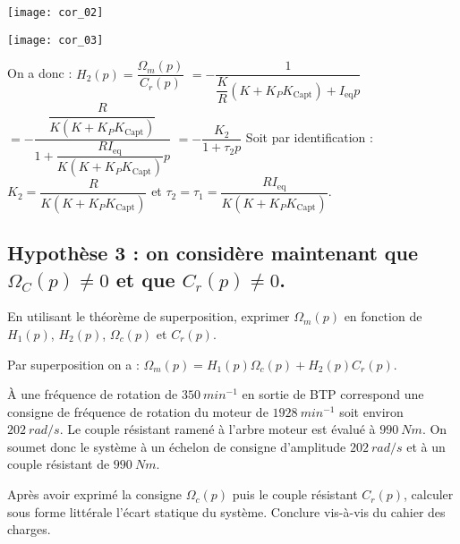 \ifprof
\begin{corrige}
\begin{center}
\texttt{[image: cor\_02]}
\end{center}
\begin{center}
\texttt{[image: cor\_03]}
\end{center}
On a donc :	
$H_2 (p)=\dfrac{\Omega_m (p)}{C_r (p)}$
$=-\dfrac{1}{\dfrac{K}{R} \left(K+K_P K_{\text{Capt}} \right)+I_{\text{eq}} p}$
$=-\dfrac{\dfrac{R}{K \left(K+K_P  K_{\text{Capt}} \right) }}{1+\dfrac{R I_{\text{eq}}}{K \left(K+K_P K_{\text{Capt}} \right) } p}$
$=-\dfrac{K_2}{1+\tau_2 p}$
Soit par identification : $K_2=\dfrac{R}{K \left(K+K_P  K_{\text{Capt}} \right) }$	et	$\tau_2=\tau_1=\dfrac{R I_{\text{eq}}}{K (K+K_P K_{\text{Capt}} ) }$.





\end{corrige}
\else
\fi


\subsection*{Hypothèse 3 : on considère maintenant que  $\Omega_C (p)\neq 0$ et que $C_r (p)\neq 0$.}
\begin{question}
En utilisant le théorème de superposition, exprimer $\Omega_m (p)$ en fonction de $H_1 (p)$, $H_2 (p)$, $\Omega_c (p)$ et $C_r (p)$.
\end{question}

\ifprof
\begin{corrige}

Par superposition on a : $\Omega_m (p)=H_1 (p) \Omega_c (p)+H_2 (p) C_r (p)$.
\end{corrige}
\else
\fi


À une fréquence de rotation de $\SI{350}{min^{-1}}$ en sortie de BTP correspond une consigne de fréquence de rotation du moteur de $\SI{1 928}{min^{-1}}$ soit environ $\SI{202}{rad/s}$. Le couple résistant ramené à l'arbre moteur est évalué à $\SI{990}{Nm}$. On soumet donc le système à un échelon de consigne d'amplitude $\SI{202}{rad/s}$ et à un couple résistant de $\SI{990}{Nm}$.

\begin{question}
Après avoir exprimé la consigne  $\Omega_c (p)$ puis le couple résistant $C_r (p)$, calculer sous forme littérale l'écart statique du système. Conclure vis-à-vis du cahier des charges.
\end{question}

